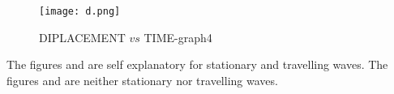 \documentclass[journal,12pt,twocolumn]{IEEEtran}
\theoremstyle{remark}
\begin{document}
\begin{figure}[ht]
                            \centering
                            \texttt{[image: d.png]}
                            \caption{DIPLACEMENT $vs$ TIME-graph4}
                            \label{fig:4}
\end{figure}
The figures  and  are self explanatory for stationary and travelling waves.
The figures  and  are neither stationary nor travelling waves. 
\end{document}
